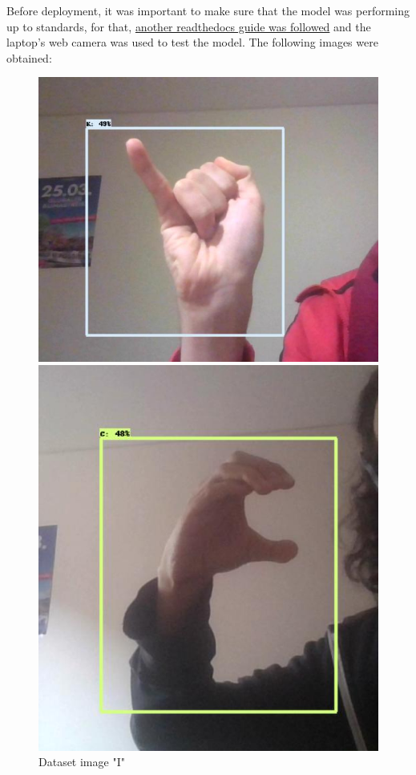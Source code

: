 \documentclass[10pt]{article}
\begin{document}
		Before deployment, it was important to make sure that the model was performing up to standards, for that, \href{https://tensorflow-object-detection-api-tutorial.readthedocs.io/en/latest/auto_examples/object_detection_camera.html#detect-objects-using-your-webcam}{another readthedocs guide was followed} \cite{7} and the laptop's web camera was used to test the model. The following images were obtained:

		\begin{figure}[H]
			\centering
			\begin{minipage}[b]{0.45\textwidth}
				\includegraphics[width=\textwidth]{imgs/myGestures4.jpg}
				\caption{Dataset image "I"}
			\end{minipage}
			\hfill
			\begin{minipage}[b]{0.45\textwidth}
				\includegraphics[width=\textwidth]{imgs/myGestures3.jpg}

\end{minipage}
\end{figure}
\end{document}
